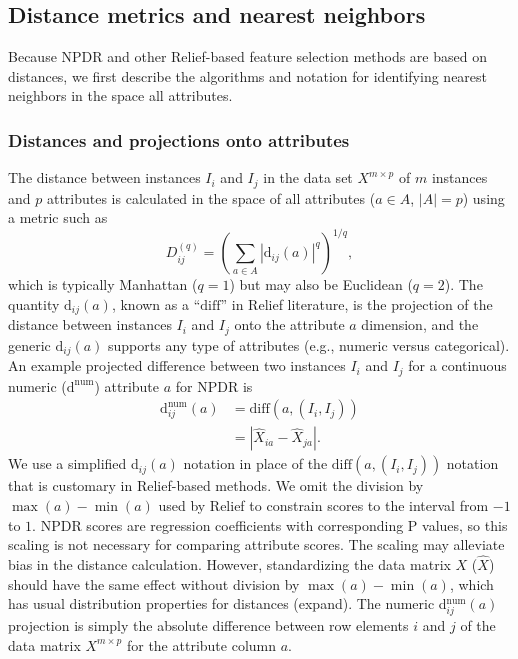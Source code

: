 \documentclass[10pt]{article}
\begin{document}
\subsection{Distance metrics and nearest neighbors}\label{sec:reform}
Because NPDR and other Relief-based feature selection methods are based on distances, we first describe the algorithms and notation for identifying nearest neighbors in the space all attributes. 

\subsubsection{Distances and projections onto attributes}
The distance between instances $I_i$ and $I_j$ in the data set $X^{m \times p}$ of $m$ instances and $p$ attributes is calculated in the space of all attributes ($a \in A$, $|A|=p$) using a metric such as
\begin{equation}\label{eq:D}
D^{(q)}_{ij}=\left(\sum_{a\in A}|\text{d}_{ij}(a)|^q\right)^{1/q},
\end{equation}
which is typically Manhattan ($q=1$) but may also be Euclidean ($q=2$). The quantity 
$\text{d}_{ij}(a)$,
known as a ``$\text{diff}$'' in Relief literature, is the projection of the distance between instances $I_i$ and $I_j$ onto the attribute $a$ dimension, and the 
generic $\text{d}_{ij}(a)$ supports any type of attributes
(e.g., numeric versus categorical).
An example projected difference between two instances $I_i$ and $I_j$ for a continuous numeric ($\text{d}^{\text{num}}$) attribute $a$ for NPDR is
\begin{equation}\label{eq:diff}
\begin{aligned}
\text{d}^{\text{num}}_{ij}(a)&=\text{diff}(a,(I_i,I_j))\\
                                            & = {|\hat{X}_{ia}-\hat{X}_{ja}|}.
 \end{aligned}
\end{equation}
We use a simplified d$_{ij}(a)$ notation in place of the $\text{diff}(a,(I_i,I_j))$ notation that is customary in Relief-based methods. We omit the division by $\max(a)-\min(a)$ used by Relief to constrain scores to the interval from $-1$ to $1$. NPDR scores are regression coefficients with corresponding P values, so this scaling is not necessary for comparing attribute scores. The scaling may alleviate bias in the distance calculation. However, standardizing the data matrix $X$ ($\hat{X}$) should have the same effect without division by $\max(a)-\min(a)$, which has usual distribution properties for distances (expand). The numeric d$^{\text{num}}_{ij}(a)$ projection is simply the absolute difference between row elements $i$ and $j$ of the data matrix $X^{m \times p}$ for the attribute column $a$. 
\end{document}
